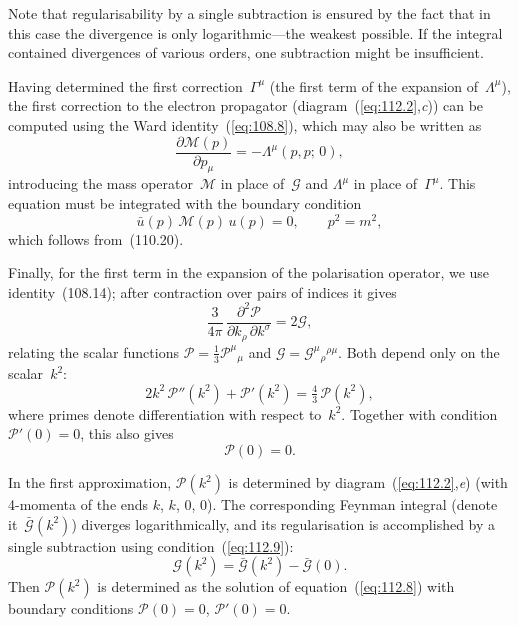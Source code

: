 
Note that regularisability by a single subtraction is ensured by the fact that in this case the divergence is only logarithmic---the weakest possible. If the integral contained divergences of various orders, one subtraction might be insufficient.

Having determined the first correction~$\Gamma^\mu$ (the first term of the expansion of~$\Lambda^\mu$), the first correction to the electron propagator (diagram~(\ref{eq:112.2},\textit{c})) can be computed using the Ward identity~(\ref{eq:108.8}), which may also be written as
\begin{equation}
\frac{\partial \mathcal{M}(p)}{\partial p_\mu} = -\Lambda^\mu(p,p;\,0),
\label{eq:112.6}
\end{equation}
introducing the mass operator~$\mathcal{M}$ in place of~$\mathcal{G}$ and $\Lambda^\mu$ in place of~$\Gamma^\mu$. This equation must be integrated with the boundary condition
\begin{equation}
\bar{u}(p)\,\mathcal{M}(p)\,u(p) = 0, \qquad p^2 = m^2,
\label{eq:112.7}
\end{equation}
which follows from~(110.20).

Finally, for the first term in the expansion of the polarisation operator, we use identity~(108.14); after contraction over pairs of indices it gives
\[
\frac{3}{4\pi}\,\frac{\partial^2 \mathcal{P}}{\partial k_\rho\,\partial k^\sigma} = 2\mathcal{G},
\]
relating the scalar functions $\mathcal{P} = \tfrac{1}{3}\mathcal{P}^\mu{}_\mu$ and $\mathcal{G} = \mathcal{G}^\mu{}_{\rho}{}^{\rho\mu}$. Both depend only on the scalar~$k^2$:
\begin{equation}
2k^2\,\mathcal{P}''(k^2) + \mathcal{P}'(k^2) = \tfrac{4}{3}\,\mathcal{P}(k^2),
\label{eq:112.8}
\end{equation}
where primes denote differentiation with respect to~$k^2$. Together with condition~$\mathcal{P}'(0) = 0$, this also gives
\begin{equation}
\mathcal{P}(0) = 0.
\label{eq:112.9}
\end{equation}


In the first approximation, $\mathcal{P}(k^2)$ is determined by diagram~(\ref{eq:112.2},\textit{e}) (with 4-momenta of the ends $k$, $k$, $0$, $0$). The corresponding Feynman integral (denote it~$\bar{\mathcal{G}}(k^2)$) diverges logarithmically, and its regularisation is accomplished by a single subtraction using condition~(\ref{eq:112.9}):
\[
\mathcal{G}(k^2) = \bar{\mathcal{G}}(k^2) - \bar{\mathcal{G}}(0).
\]
Then $\mathcal{P}(k^2)$ is determined as the solution of equation~(\ref{eq:112.8}) with boundary conditions $\mathcal{P}(0) = 0$, $\mathcal{P}'(0) = 0$.

